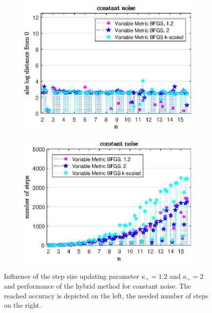 \begin{figure}[ht]%
	\begin{subfigure}{0.49\textwidth}
		\includegraphics[width=\textwidth]{Pictures/Plots/constant_noise_comp.eps}%
	\end{subfigure}
	\begin{subfigure}{0.49\textwidth}
		\includegraphics[width=\textwidth]{Pictures/Plots/steps_constant_noise_comp.eps}%
	\end{subfigure}
	\caption[Influence of the step size updating parameter and hybrid method: constant noise]{Influence of the step size updating parameter \(\kappa_+ = 1.2\) and \(\kappa_+ =2 \) and performance of the hybrid method for constant noise. The reached accuracy is depicted on the left, the needed number of steps on the right.}
	\label{fig_const_noise_comp}
\end{figure}


